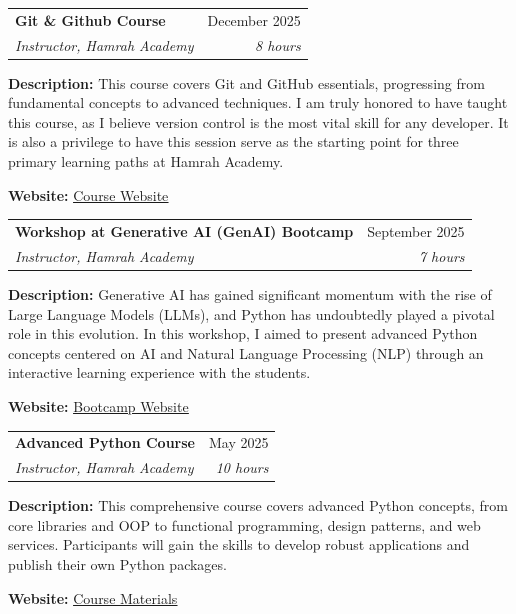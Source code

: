\documentclass[a4paper,11pt]{article}
\makeatletter
\newcommand{\resumeQuadHeading}[4]{
\item
\begin{tabular*}{\linewidth}[t]{l@{\extracolsep{\fill}}r}
\textbf{#1} & #2 \\
\textit{\small#3} & \textit{\small #4} \\
\end{tabular*}
}
\makeatother
\begin{document}
\resumeQuadHeading{\faChalkboardTeacher\hspace{3pt} Git \& Github Course}{December 2025}
{Instructor, Hamrah Academy}{8 hours}
{\small
	\textbf{Description:} This course covers Git and GitHub essentials, progressing from fundamental concepts to advanced techniques. I am truly honored to have taught this course, as I believe version control is the most vital skill for any developer. It is also a privilege to have this session serve as the starting point for three primary learning paths at Hamrah Academy.

	\textbf{Website:} \href{https://hamrah.academy/course/3867/git-github}{\uline{Course Website}}
}


\resumeQuadHeading{\faChalkboardTeacher\hspace{3pt} Workshop at Generative AI (GenAI) Bootcamp}{September 2025}
{Instructor, Hamrah Academy}{7 hours}
{\small
	\textbf{Description:} 
	Generative AI has gained significant momentum with the rise of Large Language Models (LLMs), and Python has undoubtedly played a pivotal role in this evolution. In this workshop, I aimed to present advanced Python concepts centered on AI and Natural Language Processing (NLP) through an interactive learning experience with the students.

	\textbf{Website:} \href{https://hamrah.academy/bootcamps/3719}{\uline{Bootcamp Website}}
}


\resumeQuadHeading{\faChalkboardTeacher\hspace{3pt} Advanced Python Course}{May 2025}
{Instructor, Hamrah Academy}{10 hours}
{\small
    \textbf{Description:} This comprehensive course covers advanced Python concepts, from core libraries and OOP to functional programming, design patterns, and web services. Participants will gain the skills to develop robust applications and publish their own Python packages.

    \textbf{Website:} \href{https://mohammadraziei.github.io/advanced-python-course/}{\uline{Course Materials}}
}
\end{document}
